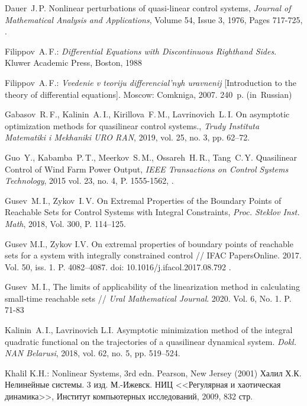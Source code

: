 \documentclass[../main.tex]{subfiles}
\begin{document}
\begin{thebibliography}{99}
Dauer~J.\,P. Nonlinear perturbations of quasi-linear control systems,
\emph{Journal of Mathematical Analysis and Applications},
Volume 54, Issue 3,
1976,
Pages 717-725,
.

Filippov~A.\,F.: \emph{Differential Equations with Discontinuous Righthand Sides}. Kluwer Academic Press, Boston, 1988

Filippov~A.\,F.: \emph{Vvedenie v teoriju differencial'nyh uravnenij} [Introduction to the theory of differential equations]. Moscow: Comkniga, 2007. 240~p. (in~Russian)

Gabasov~R.\,F., Kalinin~A.\,I.,  Kirillova~F.\,M., Lavrinovich~L.\,I. On asymptotic optimization methods for quasilinear control systems., \emph{Trudy Instituta Matematiki i Mekhaniki URO
    RAN}, 2019, vol. 25, no. 3, pp. 62–72.

Guo~Y., Kabamba~P.\,T., Meerkov~S.\,M.,  Ossareh~H.\,R., Tang~C.\,Y. Quasilinear Control of Wind Farm Power Output, \emph{IEEE Transactions on Control Systems Technology}, 2015 vol. 23, no. 4, P. 1555-1562,  .


Gusev~M.\,I., Zykov~I.\,V. On Extremal Properties of the Boundary Points of Reachable Sets for Control Systems with Integral Constraints, \emph{Proc. Steklov Inst. Math}, 2018, Vol. 300, P. 114--125. 

Gusev M.I., Zykov I.V. On extremal properties of boundary points of reachable sets for a system
with integrally constrained control // IFAC PapersOnline. 2017. Vol. 50, iss. 1. P. 4082–4087. doi:
10.1016/j.ifacol.2017.08.792 .

Gusev~M.\,I., The limits of applicability of the linearization method in calculating small-time reachable sets // \emph{Ural Mathematical Journal}. 2020. Vol. 6, No. 1. P. 71-83


Kalinin~A.\,I., Lavrinovich L.I. Asymptotic minimization method of the integral quadratic functional on
the trajectories of a quasilinear dynamical system. \emph{Dokl. NAN Belarusi}, 2018, vol. 62, no. 5, pp. 519–524.

Khalil K.H.: Nonlinear Systems, 3rd edn. Pearson, New Jersey (2001)
Халил Х.К. Нелинейные системы. 3 изд. М.-Ижевск. НИЦ <<Регулярная и хаотическая динамика>>, Институт компьютерных исследований, 2009, 832 стр.


\end{thebibliography}
\end{document}
